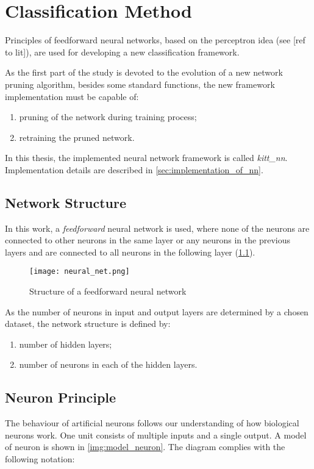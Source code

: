 \chapter{Classification Method} \label{chap:kitt_nn}
Principles of feedforward neural networks, based on the perceptron idea (see [ref to lit]), are used for developing a new classification framework.

As the first part of the study is devoted to the evolution of a new network pruning algorithm, besides some standard functions, the new framework implementation must be capable of:

\begin{enumerate}
\item pruning of the network during training process;
\item retraining the pruned network.
\end{enumerate}

In this thesis, the implemented neural network framework is called \textit{kitt\_nn}. Implementation details are described in \cref{sec:implementation_of_nn}.

\section{Network Structure} \label{sec:network_structure}
In this work, a \textit{feedforward} neural network is used, where none of the neurons are connected to other neurons in the same layer or any neurons in the previous layers and are connected to all neurons in the following layer (\cref{img:neural_net}).

\begin{figure}[H]
  \centering
  \texttt{[image: neural\_net.png]}
  \caption{Structure of a feedforward neural network}
  \label{img:neural_net}
\end{figure}

As the number of neurons in input and output layers are determined by a chosen dataset, the network structure is defined by:
\begin{enumerate}
\item number of hidden layers;
\item number of neurons in each of the hidden layers.
\end{enumerate}

\section{Neuron Principle} \label{sec:neuron_principle}
The behaviour of artificial neurons follows our understanding of how biological neurons work. One unit consists of multiple inputs and a single output. A model of neuron is shown in \cref{img:model_neuron}. The diagram complies with the following notation:

